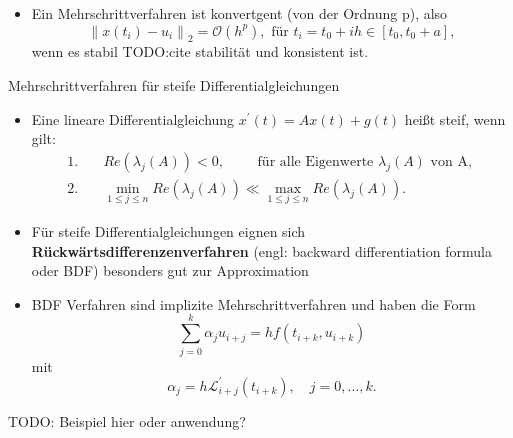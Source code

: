 \begin{frame}
    \begin{itemize}
        \item<1-> Ein Mehrschrittverfahren ist konvertgent (von der Ordnung p), also
        \[
            \left\lVert x(t_i) - u_i \right\rVert_2 = \mathcal{O}(h^p), \text{ für } t_i=t_0+ih \in [t_0,t_0+a],
        \]
        wenn es stabil TODO:cite stabilität und konsistent ist.
    \end{itemize}
\end{frame}

\begin{frame}{Mehrschrittverfahren für steife Differentialgleichungen}
    \begin{itemize}
        \item<1-> Eine lineare Differentialgleichung $x^{\prime}(t)=Ax(t)+g(t)$ heißt steif, wenn gilt:
        \begin{align*}
            1.& \quad Re(\lambda_j(A)) < 0, \qquad \text{ für alle Eigenwerte } \lambda_j(A) \text{ von A, }\\
            2.& \quad \min\limits_{1 \leq j \leq n} Re(\lambda_j(A)) \ll \max\limits_{1 \leq j \leq n} Re(\lambda_j(A)).
        \end{align*}
        \item<2-> Für steife Differentialgleichungen eignen sich \textbf{Rückwärtsdifferenzenverfahren}
        (engl: backward differentiation formula oder BDF) besonders gut zur Approximation
        \item<3-> BDF Verfahren sind implizite Mehrschrittverfahren und haben die Form
        \[
            \sum_{j=0}^{k}\alpha_j u_{i+j} = h f(t_{i+k}, u_{i+k})
        \]
        mit
        \[
            \alpha_j = h \mathcal{L}^{\prime}_{i+j} (t_{i+k}), \quad j=0,\dots,k.
        \]
    \end{itemize}
\end{frame}

\begin{frame}
    TODO: Beispiel hier oder anwendung?
\end{frame}

